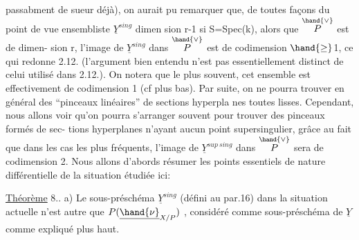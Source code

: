 
passabment de sueur déjà), on aurait pu remarquer que,  de
toutes façons du point de vue ensembliste $\underline{Y}^{sing}$  dimen%
sion r-1  si S=Spec(k), alors que $\overset{\hand{\vee}}{P}$ est de dimen-%
sion r,  l'image de $\underline{Y}^{sing}$ dans $\overset{\hand{\vee}}{P}$ est de codimension $\hand{\geq}$1, ce qui redonne
2.12. (l'argument bien entendu n'est pas essentiellement distinct de
celui utilisé dans 2.12.). On notera que le plus souvent, cet ensemble
est effectivement de codimension 1 (cf plus bas). Par suite, on ne
pourra trouver en général des ``pinceaux linéaires'' de sections hyperpla%
nes toutes   lisses. Cependant, nous allons voir qu'on
pourra s'arranger souvent pour  trouver des pinceaux formés de sec-%
tions hyperplanes n'ayant aucun point supersingulier, grâce au fait que
dans les cas les plus fréquents, l'image de $\underline{Y}^{sup\ sing}$ dans $\overset{\hand{\vee}}{P}$ sera de
codimension 2. Nous allons d'abords résumer les points essentiels
de nature différentielle de la situation étudiée ici:

\uline{Théorème} 8.. a) Le sous-préschéma $\underline{Y}^{sing}$ (défini au par.16) dans
la situation actuelle n'est autre que $P(\underline{\hand{\nu}}_{X/P})$ , considéré comme
sous-préschéma de $\underline{Y}$ comme expliqué plus haut.

